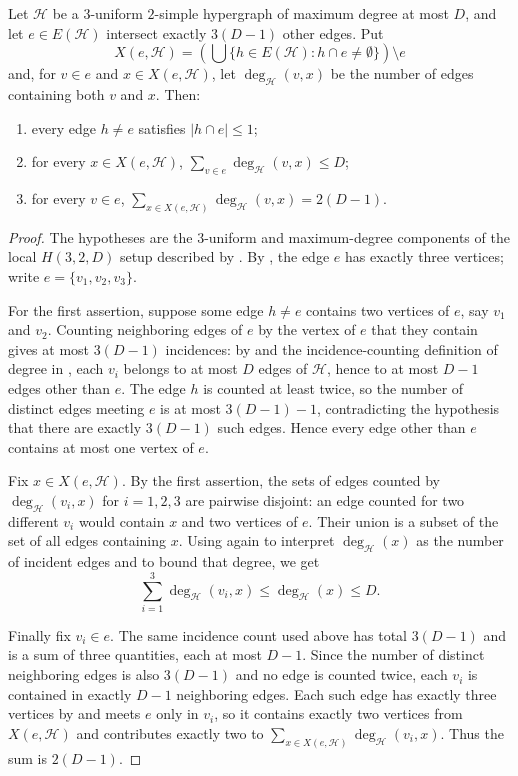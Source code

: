 \begin{lemma}
Let $\mathcal H$ be a $3$-uniform $2$-simple hypergraph of maximum degree at
most $D$, and let $e\in E(\mathcal H)$ intersect exactly $3(D-1)$ other
edges.  Put
\[
X(e,\mathcal H)=
\left(\bigcup\{h\in E(\mathcal H):h\cap e\ne\emptyset\}\right)\setminus e
\]
and, for $v\in e$ and $x\in X(e,\mathcal H)$, let
$\deg_{\mathcal H}(v,x)$ be the number of edges containing both $v$ and $x$.
Then:
\begin{enumerate}
\item every edge $h\ne e$ satisfies $|h\cap e|\le 1$;
\item for every $x\in X(e,\mathcal H)$,
$\sum_{v\in e}\deg_{\mathcal H}(v,x)\le D$;
\item for every $v\in e$,
$\sum_{x\in X(e,\mathcal H)}\deg_{\mathcal H}(v,x)=2(D-1)$.
\end{enumerate}
\end{lemma}
\begin{proof}
The hypotheses are the $3$-uniform and maximum-degree components of the
local $H(3,2,D)$ setup described by .  By
, the edge $e$ has exactly three vertices; write
$e=\{v_1,v_2,v_3\}$.

For the first assertion, suppose some edge $h\ne e$ contains two
vertices of $e$, say $v_1$ and $v_2$.  Counting neighboring edges of $e$ by
the vertex of $e$ that they contain gives at most
$3(D-1)$ incidences: by  and the incidence-counting
definition of degree in , each $v_i$ belongs to at
most $D$ edges of $\mathcal H$, hence to at most $D-1$ edges other than
$e$.  The edge $h$ is counted at least twice, so the number of distinct edges
meeting $e$ is at most $3(D-1)-1$, contradicting the hypothesis that there
are exactly $3(D-1)$ such edges.  Hence every edge other than $e$ contains at
most one vertex of $e$.

Fix $x\in X(e,\mathcal H)$.  By the first assertion, the sets of edges
counted by $\deg_{\mathcal H}(v_i,x)$ for $i=1,2,3$ are pairwise disjoint:
an edge counted for two different $v_i$ would contain $x$ and two vertices
of $e$.  Their union is a subset of the set of all edges containing $x$.
Using again  to interpret $\deg_{\mathcal H}(x)$
as the number of incident edges and  to bound that
degree, we get
\[
\sum_{i=1}^3\deg_{\mathcal H}(v_i,x)\le \deg_{\mathcal H}(x)\le D.
\]

Finally fix $v_i\in e$.  The same incidence count used above has total
$3(D-1)$ and is a sum of three quantities, each at most $D-1$.  Since the
number of distinct neighboring edges is also $3(D-1)$ and no edge is counted
twice, each $v_i$ is contained in exactly $D-1$ neighboring edges.  Each such
edge has exactly three vertices by  and meets
$e$ only in $v_i$, so it contains exactly two
vertices from $X(e,\mathcal H)$ and contributes exactly two to
$\sum_{x\in X(e,\mathcal H)}\deg_{\mathcal H}(v_i,x)$.  Thus the sum is
$2(D-1)$.
\end{proof}
